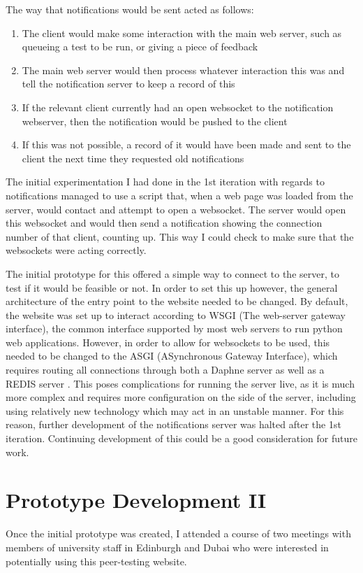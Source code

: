 \documentclass[a4paper,11pt]{report}
\begin{document}
The way that notifications would be sent acted as follows:
\begin{enumerate}
\item The client would make some interaction with the main web server, such as queueing a test to be run, or giving a piece of feedback
\item The main web server would then process whatever interaction this was and tell the notification server to keep a record of this
\item If the relevant client currently had an open websocket to the notification webserver, then the notification would be pushed to the client
\item If this was not possible, a record of it would have been made and sent to the client the next time they requested old notifications
\end{enumerate}
The initial experimentation I had done in the 1st iteration with regards to notifications managed to use a script that, when a web page was loaded from the server, would contact and attempt to open a websocket. The server would open this websocket and would then send a notification showing the connection number of that client, counting up. This way I could check to make sure that the websockets were acting correctly.\par
The initial prototype for this offered a simple way to connect to the server, to test if it would be feasible or not. In order to set this up however, the general architecture of the entry point to the website needed to be changed. By default, the website was set up to interact according to WSGI (The web-server gateway interface), the common interface supported by most web servers to run python web applications\cite{python_software_foundation_pep_2010}. However, in order to allow for websockets to be used, this needed to be changed to the ASGI (ASynchronous Gateway Interface), which requires routing all connections through both a Daphne server as well as a REDIS server \cite{django_channels_2016}. This poses complications for running the server live, as it is much more complex and requires more configuration on the side of the server, including using relatively new technology which may act in an unstable manner. For this reason, further development of the notifications server was halted after the 1st iteration. Continuing development of this could be a good consideration for future work.


\chapter{Prototype Development II}
\label{ch:proto2}
Once the initial prototype was created, I attended a course of two meetings with members of university staff in Edinburgh and Dubai who were interested in potentially using this peer-testing website.\par
\end{document}
